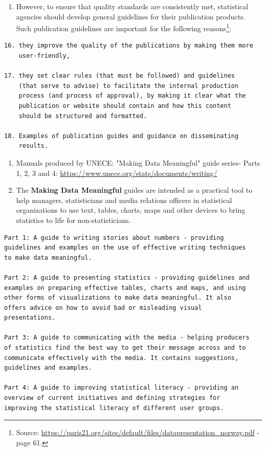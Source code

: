 \documentclass[
]{article}
\providecommand{\tightlist}{%
  \setlength{\itemsep}{0pt}\setlength{\parskip}{0pt}}
\begin{document}
\begin{enumerate}
\def\labelenumi{\arabic{enumi}.}
\setcounter{enumi}{519}
\tightlist
\item
  However, to ensure that quality standards are consistently met,
  statistical agencies should develop general guidelines for their
  publication products. Such publication guidelines are important for
  the following reasons\footnote{Source:
    \url{https://paris21.org/sites/default/files/datapresentation_norway.pdf}
    - page 61.}:
\end{enumerate}

\begin{verbatim}
16. they improve the quality of the publications by making them more
    user-friendly,

17. they set clear rules (that must be followed) and guidelines
    (that serve to advise) to facilitate the internal production
    process (and process of approval), by making it clear what the
    publication or website should contain and how this content
    should be structured and formatted.

18. Examples of publication guides and guidance on disseminating
    results.
\end{verbatim}

\begin{enumerate}
\def\labelenumi{\arabic{enumi}.}
\setcounter{enumi}{520}
\item
  Manuals produced by UNECE: "Making Data Meaningful" guide series-
  Parts 1, 2, 3 and 4:
  \url{https://www.unece.org/stats/documents/writing/}
\item
  The \textbf{Making Data Meaningful} guides are intended as a practical
  tool to help managers, statisticians and media relations officers in
  statistical organizations to use text, tables, charts, maps and
  other devices to bring statistics to life for non-statisticians.
\end{enumerate}

\begin{verbatim}
Part 1: A guide to writing stories about numbers - providing
guidelines and examples on the use of effective writing techniques
to make data meaningful.

Part 2: A guide to presenting statistics - providing guidelines and
examples on preparing effective tables, charts and maps, and using
other forms of visualizations to make data meaningful. It also
offers advice on how to avoid bad or misleading visual
presentations.

Part 3: A guide to communicating with the media - helping producers
of statistics find the best way to get their message across and to
communicate effectively with the media. It contains suggestions,
guidelines and examples.

Part 4: A guide to improving statistical literacy - providing an
overview of current initiatives and defining strategies for
improving the statistical literacy of different user groups.
\end{verbatim}
\end{document}
